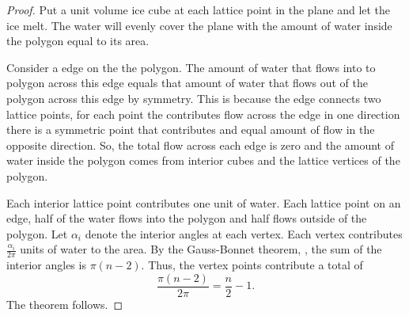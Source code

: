 \begin{proof}
	Put a unit volume ice cube at each lattice point in the plane and let the ice melt.
	The water will evenly cover the plane with the amount of water inside the polygon 
	equal to its area.
	
	Consider a edge on the the polygon. The amount of water that flows
	into to polygon across this edge equals that amount of water that flows out of the polygon
	across this edge by symmetry. This is because the edge connects two lattice points,
	for each point the contributes flow across the edge in one direction there is a symmetric
	point that contributes and equal amount of flow in the opposite direction.
	So, the total flow across each edge is zero and
	the  amount of water inside the polygon comes from interior cubes and the lattice vertices
	of the polygon.
	
	Each interior lattice point contributes one unit of water. 
	Each lattice point on an edge, half of the water flows into the polygon and
	half flows outside of the polygon.
	Let $\alpha_i$ denote the interior angles at each vertex.
	Each vertex contributes $\frac{\alpha_i}{2\pi}$ units of water to the area.
	By the Gauss-Bonnet theorem, , the sum of the interior
	angles is $\pi(n-2)$. Thus, the vertex points contribute a total of 
	$$\frac{\pi(n-2)}{2\pi}=\frac{n}{2}-1.$$
	The theorem follows.

\end{proof}




